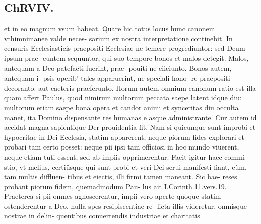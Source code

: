 \documentclass{article}
\begin{document}
\begin{pages}
\section*{ChRVIV. }
\marginpar{[ p.385 ]}\pstart et in eo magnum vsum habeat. Quare hic totus locus hunc canonem vthimnimanee valde neces- sarium ex nostra interpretatione continebit.  \pend\pstart In censuris Ecclesiasticis praepositi Ecclesiae ne temere progrediuntor: sed Deum ipsum prae- euntem sequuntor, qui suo tempore bonos et malos detegit.  \pend\pstart Malos, antequam a Deo patefacti fuerint, prae- pouiti ne eiiciunto. Bonos autem, antequam i- psis operib' tales apparuerint, ne speciali hono- re praepositi decoranto: aut caeteris praeferunto.  \pend\pstart Horum autem omnium canonum ratio est illa quam affert Paulus, quod nimirum multorum peccata saepe latent idque diu: multorum etiam saepe bona opera et candor animi et synceritas diu occulta manet, ita Domino dispensante res humanas e asque administrante.   \pend\pstart Cur autem id accidat magna sapientique Der prouidentia fit. Nam si quicunque sunt improbi et hypocritae in Dei Ecclesia, statim apparerent, neque piorum fides explorari et probari tam certo posset: neque pii ipsi tam officiosi in hoc mundo viuerent, neque etiam tuti essent, sed ab impiis opprimerentur. Facit igitur haec commi- stio, vt melius, certiûsque qui sunt probi et veri Dei serui manifesti fiant, cùm, tam multis diffluen- tibus et eiectis, illi firmi tamen maneant. Sic hae- reses probant piorum fidem, quemadmodum Pau- lus ait I.Corinth.11.vers.19. Praeterea si pii omnes agnoscerentur, impii vero aperte quoque statim ostenderentur a Deo, nulla spes resipiscentiae re- licta illis videretur, omnisque nostrae in delin- quentibus conuertendis industriae et charitatis  \pend

\end{pages}
\end{document}
